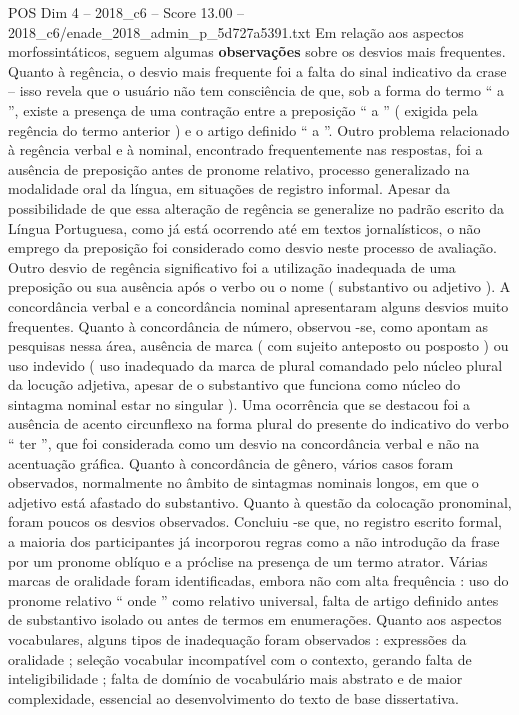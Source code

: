 \begin{textsample}{POS Dim 4 – 2018\_c6 – Score 13.00 – 2018\_c6/enade\_2018\_admin\_p\_5d727a5391.txt}
Em relação aos aspectos morfossintáticos, seguem algumas \textbf{observações} sobre os desvios mais frequentes.
Quanto à regência, o desvio mais frequente foi a falta do sinal indicativo da crase – isso revela que o usuário não tem consciência de que, sob a forma do termo “ a ”, existe a presença de uma contração entre a preposição “ a ” ( exigida pela regência do termo anterior ) e o artigo definido “ a ”.
Outro problema relacionado à regência verbal e à nominal, encontrado frequentemente nas respostas, foi a ausência de preposição antes de pronome relativo, processo generalizado na modalidade oral da língua, em situações de registro informal.
Apesar da possibilidade de que essa alteração de regência se generalize no padrão escrito da Língua Portuguesa, como já está ocorrendo até em textos jornalísticos, o não emprego da preposição foi considerado como desvio neste processo de avaliação.
Outro desvio de regência significativo foi a utilização inadequada de uma preposição ou sua ausência após o verbo ou o nome ( substantivo ou adjetivo ).
A concordância verbal e a concordância nominal apresentaram alguns desvios muito frequentes.
Quanto à concordância de número, observou -se, como apontam as pesquisas nessa área, ausência de marca ( com sujeito anteposto ou posposto ) ou uso indevido ( uso inadequado da marca de plural comandado pelo núcleo plural da locução adjetiva, apesar de o substantivo que funciona como núcleo do sintagma nominal estar no singular ).
Uma ocorrência que se destacou foi a ausência de acento circunflexo na forma plural do presente do indicativo do verbo “ ter ”, que foi considerada como um desvio na concordância verbal e não na acentuação gráfica.
Quanto à concordância de gênero, vários casos foram observados, normalmente no âmbito de sintagmas nominais longos, em que o adjetivo está afastado do substantivo.
Quanto à questão da colocação pronominal, foram poucos os desvios observados.
Concluiu -se que, no registro escrito formal, a maioria dos participantes já incorporou regras como a não introdução da frase por um pronome oblíquo e a próclise na presença de um termo atrator.
Várias marcas de oralidade foram identificadas, embora não com alta frequência : uso do pronome relativo “ onde ” como relativo universal, falta de artigo definido antes de substantivo isolado ou antes de termos em enumerações.
Quanto aos aspectos vocabulares, alguns tipos de inadequação foram observados : expressões da oralidade ; seleção vocabular incompatível com o contexto, gerando falta de inteligibilidade ; falta de domínio de vocabulário mais abstrato e de maior complexidade, essencial ao desenvolvimento do texto de base dissertativa.

\end{textsample}
